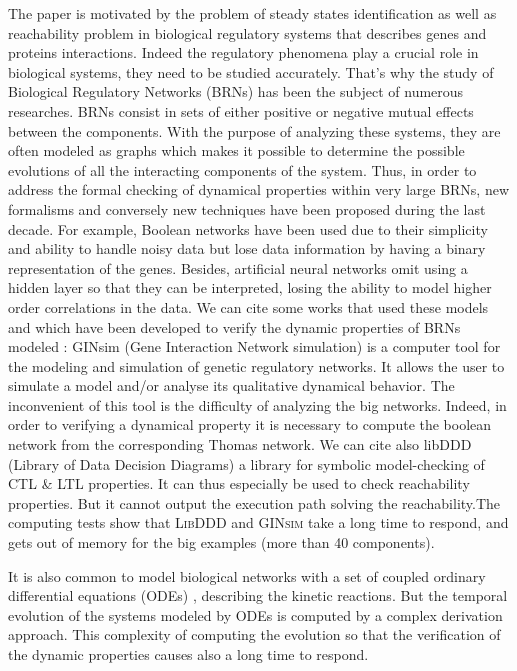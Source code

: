 The paper is motivated by the problem of steady states identification as well as reachability problem in biological regulatory systems that describes genes and proteins interactions. Indeed the regulatory phenomena play a crucial role in biological systems, they need to be studied accurately. That’s why the study of Biological Regulatory Networks (BRNs) has been the subject of numerous researches. BRNs consist in sets of either positive or negative mutual effects between the components. With the purpose of analyzing these systems, they are often modeled as graphs which makes it possible to determine the possible evolutions of all the interacting components of the system. Thus, in order to address the formal checking of dynamical properties within very large BRNs, new formalisms and conversely new techniques have been proposed during the last decade. For example, Boolean networks \cite{stuart1993origins} \cite{kauffman1969metabolic} have been used due to their simplicity and ability to handle noisy data but lose data information by having a binary representation of the genes. Besides, artificial neural networks omit using a hidden layer so that they can be interpreted, losing the ability to model higher order correlations in the data. We can cite some works that used these models and which have been developed to verify the dynamic properties of BRNs modeled : GINsim (Gene Interaction Network simulation) \cite{chaouiya2012logical, gonzalez2006ginsim} is a computer tool for the modeling and simulation of genetic regulatory networks. It allows the user to simulate a model and/or analyse its qualitative dynamical behavior. The inconvenient of this tool is the difficulty of analyzing the big networks. Indeed, in order to verifying a dynamical property it is necessary to compute the boolean network from the corresponding Thomas network. We can cite also libDDD (Library of Data Decision Diagrams) a library for symbolic model-checking of CTL \& LTL properties. It can thus especially be used to check reachability properties. But it cannot output the execution path solving the reachability.The computing tests show that \textsc{LibDDD} and \textsc{GINsim} take a long time to respond, and gets out of memory for the big examples (more than 40 components).  %

It is also common to model biological networks with a set of coupled ordinary differential equations (ODEs) \cite{chu2009models}, describing the kinetic reactions. But the temporal evolution of the systems modeled by ODEs is computed by a complex derivation approach. This complexity of computing the evolution so that the verification of the dynamic properties causes also a long time to respond. 

